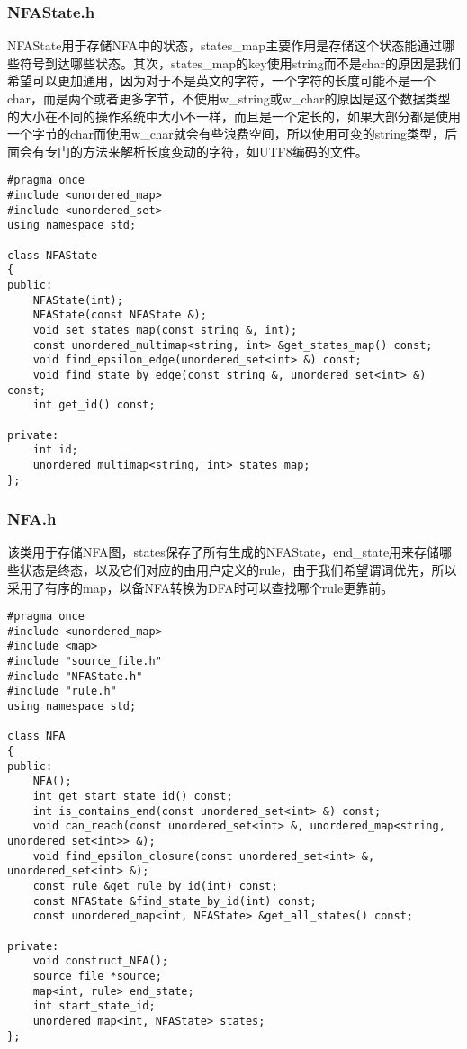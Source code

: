 \subsubsection{NFAState.h}
NFAState用于存储NFA中的状态，states\_map主要作用是存储这个状态能通过哪些符号到达哪些状态。其次，states\_map的key使用string而不是char的原因是我们希望可以更加通用，因为对于不是英文的字符，一个字符的长度可能不是一个char，而是两个或者更多字节，不使用w\_string或w\_char的原因是这个数据类型的大小在不同的操作系统中大小不一样，而且是一个定长的，如果大部分都是使用一个字节的char而使用w\_char就会有些浪费空间，所以使用可变的string类型，后面会有专门的方法来解析长度变动的字符，如UTF8编码的文件。
\lstset{language=C++}
\begin{lstlisting}
#pragma once
#include <unordered_map>
#include <unordered_set>
using namespace std;

class NFAState
{
public:
    NFAState(int);
    NFAState(const NFAState &);
    void set_states_map(const string &, int);
    const unordered_multimap<string, int> &get_states_map() const;
    void find_epsilon_edge(unordered_set<int> &) const;
    void find_state_by_edge(const string &, unordered_set<int> &) const;
    int get_id() const;

private:
    int id;
    unordered_multimap<string, int> states_map;
};
\end{lstlisting}

\subsubsection{NFA.h}
该类用于存储NFA图，states保存了所有生成的NFAState，end\_state用来存储哪些状态是终态，以及它们对应的由用户定义的rule，由于我们希望谓词优先，所以采用了有序的map，以备NFA转换为DFA时可以查找哪个rule更靠前。
\lstset{language=C++}
\begin{lstlisting}
#pragma once
#include <unordered_map>
#include <map>
#include "source_file.h"
#include "NFAState.h"
#include "rule.h"
using namespace std;

class NFA
{
public:
    NFA();
    int get_start_state_id() const;
    int is_contains_end(const unordered_set<int> &) const;
    void can_reach(const unordered_set<int> &, unordered_map<string, unordered_set<int>> &);
    void find_epsilon_closure(const unordered_set<int> &, unordered_set<int> &);
    const rule &get_rule_by_id(int) const;
    const NFAState &find_state_by_id(int) const;
    const unordered_map<int, NFAState> &get_all_states() const;

private:
    void construct_NFA();
    source_file *source;
    map<int, rule> end_state;
    int start_state_id;
    unordered_map<int, NFAState> states;
};
\end{lstlisting}
